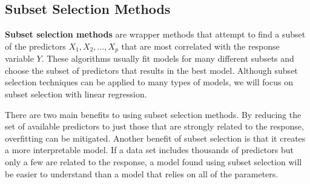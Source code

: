 \documentclass{article}
\begin{document}
	\subsection{Subset Selection Methods}
	
	\textbf{Subset selection methods} are wrapper methods that attempt to find a subset of the predictors $X_1, X_2, \dotsc, X_p$ that are most correlated with the response variable $Y$. These algorithms usually fit models for many different subsets and choose the subset of predictors that results in the best model. Although subset selection techniques can be applied to many types of models, we will focus on subset selection with linear regression.
	
	There are two main benefits to using subset selection methods. By reducing the set of available predictors to just those that are strongly related to the response, overfitting can be mitigated. Another benefit of subset selection is that it creates a more interpretable model. If a data set includes thousands of predictors but only a few are related to the response, a model found using subset selection will be easier to understand than a model that relies on all of the parameters. 
	

	
\end{document}
